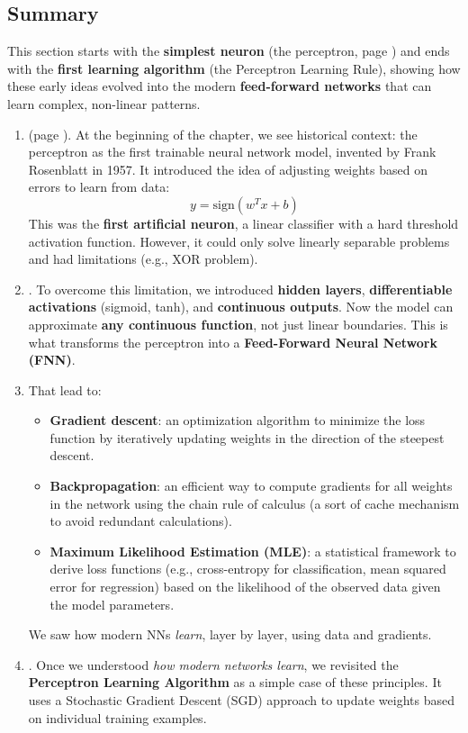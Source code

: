 \subsection{Summary}

This section starts with the \textbf{simplest neuron} (the perceptron, page \pageref{sec:the-perceptron}) and ends with the \textbf{first learning algorithm} (the Perceptron Learning Rule), showing how these early ideas evolved into the modern \textbf{feed-forward networks} that can learn complex, non-linear patterns.
\begin{enumerate}
    \item {} (page \pageref{sec:the-perceptron}). At the beginning of the chapter, we see historical context: the perceptron as the first trainable neural network model, invented by Frank Rosenblatt in 1957. It introduced the idea of adjusting weights based on errors to learn from data:
    \begin{equation*}
        y = \text{sign}\left(w^{T} x + b\right)
    \end{equation*}
    This was the \textbf{first artificial neuron}, a linear classifier with a hard threshold activation function. However, it could only solve linearly separable problems and had limitations (e.g., XOR problem).

    \item {}. To overcome this limitation, we introduced \textbf{hidden layers}, \textbf{differentiable activations} (sigmoid, tanh), and \textbf{continuous outputs}. Now the model can approximate \textbf{any continuous function}, not just linear boundaries. This is what transforms the perceptron into a \textbf{Feed-Forward Neural Network (FNN)}.

    \item {} That lead to:
    \begin{itemize}
        \item \textbf{Gradient descent}: an optimization algorithm to minimize the loss function by iteratively updating weights in the direction of the steepest descent.
        \item \textbf{Backpropagation}: an efficient way to compute gradients for all weights in the network using the chain rule of calculus (a sort of cache mechanism to avoid redundant calculations).
        \item \textbf{Maximum Likelihood Estimation (MLE)}: a statistical framework to derive loss functions (e.g., cross-entropy for classification, mean squared error for regression) based on the likelihood of the observed data given the model parameters.
    \end{itemize}
    We saw how modern NNs \emph{learn}, layer by layer, using data and gradients.~

    \item {}. Once we understood \emph{how modern networks learn}, we revisited the \textbf{Perceptron Learning Algorithm} as a simple case of these principles. It uses a Stochastic Gradient Descent (SGD) approach to update weights based on individual training examples.
\end{enumerate}
